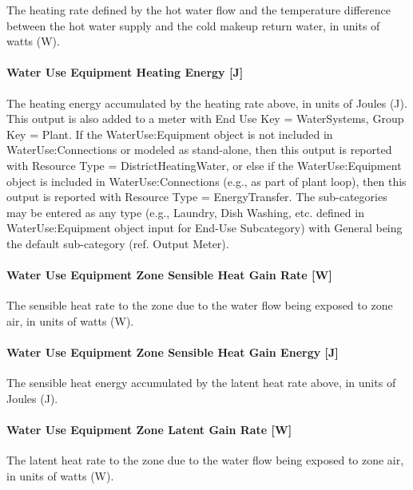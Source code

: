 The heating rate defined by the hot water flow and the temperature difference between the hot water supply and the cold makeup return water, in units of watts (W).

\paragraph{Water Use Equipment Heating Energy {[}J{]}}\label{water-use-equipment-heating-energy-j}

The heating energy accumulated by the heating rate above, in units of Joules (J). This output is also added to a meter with End Use Key = WaterSystems, Group Key = Plant. If the WaterUse:Equipment object is not included in WaterUse:Connections or modeled as stand-alone, then this output is reported with Resource Type = DistrictHeatingWater, or else if the WaterUse:Equipment object is included in WaterUse:Connections (e.g., as part of plant loop), then this output is reported with Resource Type = EnergyTransfer. The sub-categories may be entered as any type (e.g., Laundry, Dish Washing, etc. defined in WaterUse:Equipment object input for End-Use Subcategory) with General being the default sub-category (ref. Output Meter).

\paragraph{Water Use Equipment Zone Sensible Heat Gain Rate {[}W{]}}\label{water-use-equipment-zone-sensible-heat-gain-rate-w}

The sensible heat rate to the zone due to the water flow being exposed to zone air, in units of watts (W).

\paragraph{Water Use Equipment Zone Sensible Heat Gain Energy {[}J{]}}\label{water-use-equipment-zone-sensible-heat-gain-energy-j}

The sensible heat energy accumulated by the latent heat rate above, in units of Joules (J).

\paragraph{Water Use Equipment Zone Latent Gain Rate {[}W{]}}\label{water-use-equipment-zone-latent-gain-rate-w}

The latent heat rate to the zone due to the water flow being exposed to zone air, in units of watts (W).

